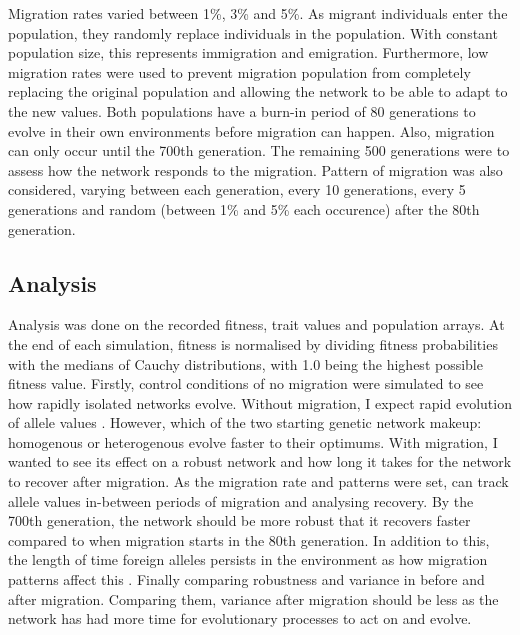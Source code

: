 Migration rates varied between 1\%, 3\% and 5\%. As migrant individuals enter the population, they randomly replace individuals in the population. With constant population size, this represents immigration and emigration. Furthermore, low migration rates were used to prevent migration population from completely replacing the original population and allowing the network to be able to adapt to the new values. Both populations have a burn-in period of 80 generations to evolve in their own environments before migration can happen. Also, migration can only occur until the 700th generation. The remaining 500 generations were to assess how the network responds to the migration. Pattern of migration was also considered, varying between each generation, every 10 generations, every 5 generations and random (between 1\% and 5\% each occurence) after the 80th generation.
\subsection{Analysis}
Analysis was done on the recorded fitness, trait values and population arrays. At the end of each simulation, fitness is normalised by dividing fitness probabilities with the medians of Cauchy distributions, with 1.0 being the highest possible fitness value. Firstly, control conditions of no migration were simulated to see how rapidly isolated networks evolve. Without migration, I expect rapid evolution of allele values \cite{garcia1997genetic}. However, which of the two starting genetic network makeup: homogenous or heterogenous evolve faster to their optimums. With migration, I wanted to see its effect on a robust network and how long it takes for the network to recover after migration. As the migration rate and patterns were set, can track allele values in-between periods of migration and analysing recovery. By the 700th generation, the network should be more robust that it recovers faster compared to when migration starts in the 80th generation. In addition to this, the length of time foreign alleles persists in the environment as how migration patterns affect this \cite{w2004dispersal}. Finally comparing robustness and variance in before and after migration. Comparing them, variance after migration should be less as the network has had more time for evolutionary processes to act on and evolve.
